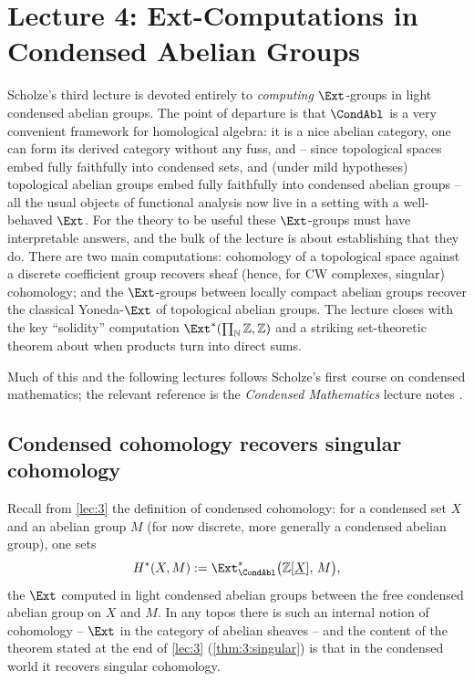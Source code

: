 \section{Lecture 4: Ext-Computations in Condensed Abelian Groups}
\label{lec:4}

Scholze's third lecture is devoted entirely to \emph{computing} $\Ext$-groups in
light condensed abelian groups. The point of departure is that $\CondAbl$ is a
very convenient framework for homological algebra: it is a nice abelian
category, one can form its derived category without any fuss, and -- since
topological spaces embed fully faithfully into condensed sets, and (under mild
hypotheses) topological abelian groups embed fully faithfully into condensed
abelian groups -- all the usual objects of functional analysis now live in a
setting with a well-behaved $\Ext$. For the theory to be useful these
$\Ext$-groups must have interpretable answers, and the bulk of the lecture is
about establishing that they do. There are two main computations: cohomology of
a topological space against a discrete coefficient group recovers sheaf (hence,
for CW complexes, singular) cohomology; and the $\Ext$-groups between locally
compact abelian groups recover the classical Yoneda-$\Ext$ of topological
abelian groups. The lecture closes with the key ``solidity'' computation
$\Ext^\ast(\prod_{\mathbb{N}}\mathbb{Z},\mathbb{Z})$ and a striking
set-theoretic theorem about when products turn into direct sums.

Much of this and the following lectures follows Scholze's first course on
condensed mathematics; the relevant reference is the \emph{Condensed
Mathematics} lecture notes \cite{clausen2019condensed}.

\subsection{Condensed cohomology recovers singular cohomology}

Recall from \cref{lec:3} the definition of condensed cohomology: for a condensed
set $X$ and an abelian group $M$ (for now discrete, more generally a condensed
abelian group), one sets
\[
H^\ast(X,M):=\Ext^\ast_{\CondAbl}\bigl(\mathbb{Z}[\underline{X}],\,M\bigr),
\]
the $\Ext$ computed in light condensed abelian groups between the free condensed
abelian group on $X$ and $M$. In any topos there is such an internal notion of
cohomology -- $\Ext$ in the category of abelian sheaves -- and the content of
the theorem stated at the end of \cref{lec:3} (\cref{thm:3:singular}) is that in
the condensed world it recovers singular cohomology.

